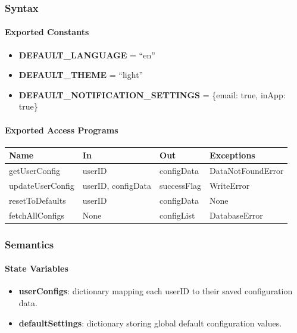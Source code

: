 \documentclass[12pt, titlepage]{article}
\begin{document}
\subsubsection{Syntax}

\paragraph{Exported Constants}
\begin{itemize}
  \item \textbf{DEFAULT\_LANGUAGE} = ``en''
  \item \textbf{DEFAULT\_THEME} = ``light''
  \item \textbf{DEFAULT\_NOTIFICATION\_SETTINGS} = \{email: true, inApp: true\}
\end{itemize}

\paragraph{Exported Access Programs}
\begin{center}
\renewcommand{\arraystretch}{1.2}
\begin{tabularx}{\textwidth}{l X X l}
\toprule
\textbf{Name} & \textbf{In} & \textbf{Out} & \textbf{Exceptions}\\
\midrule
getUserConfig & userID & configData & DataNotFoundError \\
updateUserConfig & userID, configData & successFlag & WriteError \\
resetToDefaults & userID & configData & None \\
fetchAllConfigs & None & configList & DatabaseError \\
\bottomrule
\end{tabularx}
\end{center}

\subsubsection{Semantics}

\paragraph{State Variables}
\begin{itemize}
  \item \textbf{userConfigs}: dictionary mapping each userID to their saved configuration data.
  \item \textbf{defaultSettings}: dictionary storing global default configuration values.
\end{itemize}
\end{document}
